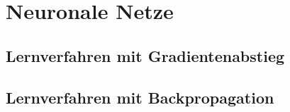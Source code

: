 \section{Neuronale Netze}

\subsection{Lernverfahren mit Gradientenabstieg}

\subsection{Lernverfahren mit Backpropagation}